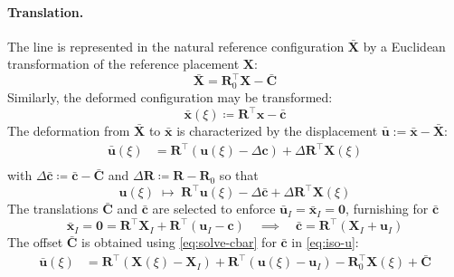 \paragraph{Translation.}
The line is represented in the natural reference configuration \(\bar{\bm{X}}\) by a Euclidean transformation of the reference placement \(\bm{X}\):
\[
\bar{\bm{X}} = \bm{R}_0^{\top}\bm{X} - \bar{\bm{C}}
\]
Similarly, the deformed configuration may be transformed:
\[
\bar{\bm{x}}(\xi) \coloneq  \bm{R}^{\top}\bm{x} - \bar{\bm{c}}
\]
The deformation from \(\bar{\bm{X}}\) to \(\bar{\bm{x}}\) is characterized by the displacement \(\bar{\bm{u}} :=  \bar{\bm{x}} - \bar{\bm{X}}\):
\[
\begin{aligned}
\bar{\bm{u}}(\xi) 
&= \bm{R}^{\top}(\bm{u}(\xi) - \Delta \bm{c}) + \Delta \bm{R}^{\top}\bm{X}(\xi) \\
\end{aligned}
\]
with \(\Delta \bar{\bm{c}} \coloneq \bar{\bm{c}} - \bar{\bm{C}}\) and \(\Delta \bm{R} \coloneq \bm{R} - \bm{R}_0\)
so that
\begin{equation}
    \bm{u}(\xi)\;\mapsto\; \bm{R}^{\top}\bm{u}(\xi) - \Delta \bar{\bm{c}} + \Delta \bm{R}^{\top}\bm{X}(\xi)
\label{eq:iso-u}
\end{equation}
The translations \(\bar{\bm{C}}\) and \(\bar{\bm{c}}\) are selected to enforce \(\bar{\bm{u}}_I = \bar{\bm{x}}_I = \mathbf{0}\), furnishing for \(\bar{\bm{c}}\)
%
\begin{equation}
\bar{\bm{x}}_I = \mathbf{0} = \bm{R}^{\top}\bm{X}_I + \bm{R}^{\top}(\bm{u}_I - \bm{c})
\quad\implies\quad 
\bar{\bm{c}} = \bm{R}^{\top}(\bm{X}_I + \bm{u}_I)
\label{eq:solve-cbar}
\end{equation}
%
The offset \(\bar{\bm{C}}\) is obtained using \eqref{eq:solve-cbar} for \(\bar{\bm{c}}\) in \eqref{eq:iso-u}:
\[
\begin{aligned}
\bar{\bm{u}}(\xi)
&= \bm{R}^{\top}(\bm{X}(\xi)-\bm{X}_I) 
 + \bm{R}^{\top}(\bm{u}(\xi)-\bm{u}_I) - \bm{R}_0^{\top}\bm{X}(\xi) + \bar{\bm{C}} \\
\end{aligned}
\]
